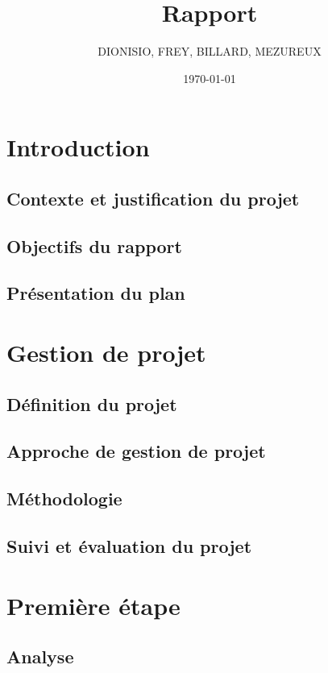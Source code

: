 \documentclass[a4paper, 12pt]{report}
\title{Rapport}
\author{DIONISIO, FREY, BILLARD, MEZUREUX}
\date{\today}
\begin{document}
\maketitle
\dominitoc
{}
\tableofcontents

\chapter{Introduction}
\minitoc
{}
\clearpage
    \section{Contexte et justification du projet}
    \section{Objectifs du rapport}
    \section{Présentation du plan}
    


\chapter{Gestion de projet}
\minitoc
{}
\clearpage
    \section{Définition du projet}
    \section{Approche de gestion de projet}
    \section{Méthodologie}
    \section{Suivi et évaluation du projet}
    

\chapter{Première étape}
\minitoc
{}
\clearpage
    \section{Analyse}
\end{document}
